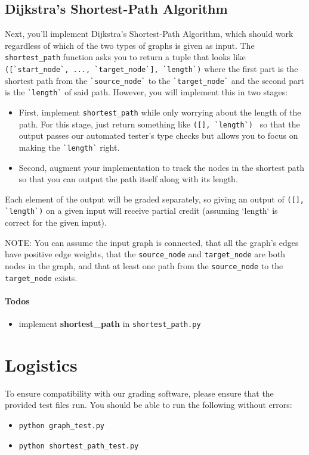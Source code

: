 \documentclass{article}
\begin{document}
   \subsection{Dijkstra's Shortest-Path Algorithm}
   Next, you'll implement Dijkstra's Shortest-Path Algorithm, which should work regardless of which of the two types of graphs is given as input. The \verb|shortest_path| function asks you to return a tuple that looks like \verb|([`start_node`, ..., `target_node`], `length`)| where the first part is the shortest path from the \verb|`source_node`| to the \verb|`target_node`| and the second part is the \verb|`length`| of said path. However, you will implement this in two stages:
   \begin{itemize}
       \item First, implement \verb|shortest_path| while only worrying about the length of the path. For this stage, just return something like \verb|([], `length`) | so that the output passes our automated tester's type checks but allows you to focus on making the \verb|`length`| right.
       \item Second, augment your implementation to track the nodes in the shortest path so that you can output the path itself along with its length.
   \end{itemize}
   
   Each element of the output will be graded separately, so giving an output of \verb|([], `length`)| on a given input will receive partial credit (assuming `length` is correct for the given input).
   
   NOTE: You can assume the input graph is connected, that all the graph's edges have positive edge weights, that the \verb|source_node| and \verb|target_node| are both nodes in the graph, and that at least one path from the \verb|source_node| to the \verb|target_node| exists.
   
\paragraph{Todos}
   \begin{itemize}
        \item implement \textbf{shortest\_path} in  \verb|shortest_path.py|
    \end{itemize}
   
   \section{Logistics}
   To ensure compatibility with our grading software, please ensure that the provided test files run. You should be able to run the following without errors:
   \begin{itemize}
        \item \verb|python graph_test.py|
        \item \verb|python shortest_path_test.py|
    \end{itemize}
\end{document}
